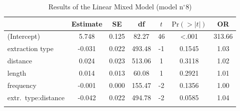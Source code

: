 \begin{table}
\begin{tabularx}{\textwidth}{Q S[table-format=-1.3] 
                  S[table-format=1.3] 
                  S[table-format=3.2] 
                  S[table-format=-1] 
                  S[table-format=<1.4] 
                  S[table-format=3.2]}
  \lsptoprule
 & {Estimate} & {SE} & {df} & {$t$} & {$\text{Pr}(>|t|)$} & {OR} \\ 
  \midrule
(Intercept) & 5.748 & 0.125 & 82.27 & 46 & <.001 & 313.66 \\ 
  extraction type & -0.031 & 0.022 & 493.48 & -1 & 0.1545 & 1.03 \\ 
  distance & 0.024 & 0.023 & 513.06 & 1 & 0.3118 & 1.02 \\ 
  length & 0.014 & 0.013 & 60.08 & 1 & 0.2921 & 1.01 \\ 
  frequency & -0.001 & 0.000 & 155.47 & -2 & 0.1356 & 1.00 \\ 
  extr.\ type:distance & -0.042 & 0.022 & 494.78 & -2 & 0.0585 & 1.04 \\ 
   \lspbottomrule
\end{tabularx}
\caption{Results of the Linear Mixed Model (model n$^{\circ}$8)}
\label{tab:exp03-m8}
\end{table}
